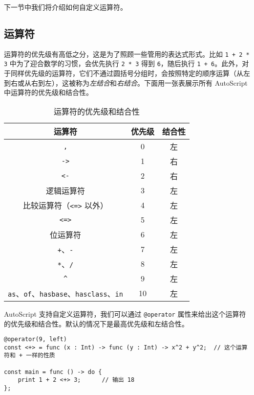 下一节中我们将介绍如何自定义运算符。


\subsection{运算符}

运算符的优先级有高低之分，这是为了照顾一些管用的表达式形式。比如 \lstinline!1 + 2 * 3! 中为了迎合数学的习惯，会优先执行 \lstinline!2 * 3! 得到 \lstinline!6!，随后执行 \lstinline!1 + 6!。此外，对于同样优先级的运算符，它们不通过圆括号分组时，会按照特定的顺序运算（从左到右或从右到左），这被称为\emph{左结合}和\emph{右结合}。下面用一张表展示所有 AutoScript 中运算符的优先级和结合性。

\begin{table}[h]
    \centering
    \begin{tabular}{|c|c|c|} \hline
        运算符 & 优先级 & 结合性 \\\hline
        \lstinline!,! & 0 & 左 \\\hline
        \lstinline!->! & 1 & 右 \\\hline
        \lstinline!<-! & 2 & 右 \\\hline
        逻辑运算符 & 3 & 左 \\\hline
        比较运算符（\lstinline!<=>! 以外） & 4 & 左 \\\hline
        \lstinline!<=>! & 5 & 左 \\\hline
        位运算符 & 6 & 左 \\\hline
        \lstinline!+!、\lstinline!-! & 7 & 左 \\\hline
        \lstinline!*!、\lstinline!/! & 8 & 左 \\\hline
        \lstinline!^! & 9 & 左 \\\hline
        \lstinline!as!、\lstinline!of!、\lstinline!hasbase!、\lstinline!hasclass!、\lstinline!in! & 10 & 左 \\\hline
    \end{tabular}
    \caption{运算符的优先级和结合性}
    \label{tab:operators}
\end{table}

AutoScript 支持自定义运算符，我们可以通过 \lstinline!@operator! 属性来给出这个运算符的优先级和结合性。默认的情况下是最高优先级和左结合性。

\begin{lstlisting}
@operator(9, left)
const <+> = func (x : Int) -> func (y : Int) -> x^2 + y^2;  // 这个运算符和 + 一样的性质

const main = func () -> do {
    print 1 + 2 <+> 3;      // 输出 18
};
\end{lstlisting}

